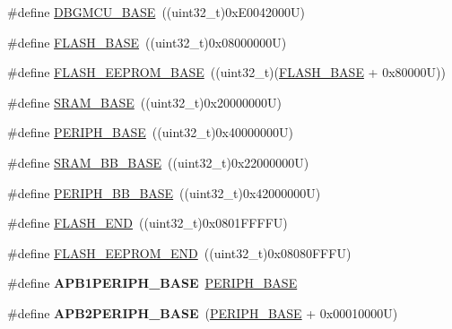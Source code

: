 \begin{DoxyCompactItemize}
\item 
\#define \hyperlink{group___peripheral__memory__map_ga4adaf4fd82ccc3a538f1f27a70cdbbef}{D\-B\-G\-M\-C\-U\-\_\-\-B\-A\-S\-E}~((uint32\-\_\-t)0x\-E0042000\-U)
\item 
\#define \hyperlink{group___peripheral__memory__map_ga23a9099a5f8fc9c6e253c0eecb2be8db}{F\-L\-A\-S\-H\-\_\-\-B\-A\-S\-E}~((uint32\-\_\-t)0x08000000\-U)
\item 
\#define \hyperlink{group___peripheral__memory__map_ga45b9071c81cb72a66e2e3195343fcb3a}{F\-L\-A\-S\-H\-\_\-\-E\-E\-P\-R\-O\-M\-\_\-\-B\-A\-S\-E}~((uint32\-\_\-t)(\hyperlink{group___peripheral__memory__map_ga23a9099a5f8fc9c6e253c0eecb2be8db}{F\-L\-A\-S\-H\-\_\-\-B\-A\-S\-E} + 0x80000\-U))
\item 
\#define \hyperlink{group___peripheral__memory__map_ga05e8f3d2e5868754a7cd88614955aecc}{S\-R\-A\-M\-\_\-\-B\-A\-S\-E}~((uint32\-\_\-t)0x20000000\-U)
\item 
\#define \hyperlink{group___peripheral__memory__map_ga9171f49478fa86d932f89e78e73b88b0}{P\-E\-R\-I\-P\-H\-\_\-\-B\-A\-S\-E}~((uint32\-\_\-t)0x40000000\-U)
\item 
\#define \hyperlink{group___peripheral__memory__map_gad3548b6e2f017f39d399358f3ac98454}{S\-R\-A\-M\-\_\-\-B\-B\-\_\-\-B\-A\-S\-E}~((uint32\-\_\-t)0x22000000\-U)
\item 
\#define \hyperlink{group___peripheral__memory__map_gaed7efc100877000845c236ccdc9e144a}{P\-E\-R\-I\-P\-H\-\_\-\-B\-B\-\_\-\-B\-A\-S\-E}~((uint32\-\_\-t)0x42000000\-U)
\item 
\#define \hyperlink{group___peripheral__memory__map_ga8be554f354e5aa65370f6db63d4f3ee4}{F\-L\-A\-S\-H\-\_\-\-E\-N\-D}~((uint32\-\_\-t)0x0801\-F\-F\-F\-F\-U)
\item 
\#define \hyperlink{group___peripheral__memory__map_gac8cb9b66893a7c4bdff3258909af027a}{F\-L\-A\-S\-H\-\_\-\-E\-E\-P\-R\-O\-M\-\_\-\-E\-N\-D}~((uint32\-\_\-t)0x08080\-F\-F\-F\-U)
\item 
\hypertarget{group___peripheral__memory__map_ga45666d911f39addd4c8c0a0ac3388cfb}{\#define {\bfseries A\-P\-B1\-P\-E\-R\-I\-P\-H\-\_\-\-B\-A\-S\-E}~\hyperlink{group___peripheral__memory__map_ga9171f49478fa86d932f89e78e73b88b0}{P\-E\-R\-I\-P\-H\-\_\-\-B\-A\-S\-E}}\label{group___peripheral__memory__map_ga45666d911f39addd4c8c0a0ac3388cfb}

\item 
\hypertarget{group___peripheral__memory__map_ga25b99d6065f1c8f751e78f43ade652cb}{\#define {\bfseries A\-P\-B2\-P\-E\-R\-I\-P\-H\-\_\-\-B\-A\-S\-E}~(\hyperlink{group___peripheral__memory__map_ga9171f49478fa86d932f89e78e73b88b0}{P\-E\-R\-I\-P\-H\-\_\-\-B\-A\-S\-E} + 0x00010000\-U)}\label{group___peripheral__memory__map_ga25b99d6065f1c8f751e78f43ade652cb}


\end{DoxyCompactItemize}
